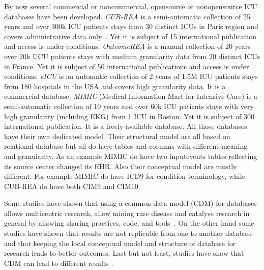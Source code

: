 \documentclass{aes2e}
\begin{document}
By now several commercial or noncommercial, opensource or nonopensource ICU
databases have been developed.
\emph{CUB-REA} is a semi-automatic collection of 25 years and over 300k ICU
patients stays from 30 distinct ICUs in Paris region and covers administrative
data only \cite{cubrea-descr,cubrea-website}. Yet it is subject of 15
international publication and access is under conditions.
\emph{OutcomeREA} is a manual collection of 20 years over 20k UCU patients
stays with medium granularity data from 20 distinct ICUs in France. Yet it is
subject of 50 international publications and access is under conditions.
\emph{eICU} \cite{eicu-website} is an automatic collection of 2 years of 1.5M
ICU patients stays from 180 hospitals in the USA and covers high granularity
data. It is a commercial database.
\emph{MIMIC} (Medical Information Mart for Intensive Care) is a
semi-automatic collection of 10 years and over 60k ICU patients stays with very
high granularity (including EKG) from 1 ICU in Boston. Yet it is subject of 300
international publication. It is a freely-available database.
All those databases have their own dedicated model. Their structural model
are all based on relational database but all do have tables and columns with
different meaning and granularity. As an example MIMIC do have two inputevents
tables reflecting its source center changed its EHR. Also their conceptual
model are mostly different. For example MIMIC do have ICD9 for condition
terminology, while CUB-REA do have both CIM9 and CIM10. 

Some studies have shown that using a common data model (CDM) for databases
allows multicentric research, allow mining rare disease  and
catalyse research in general by allowing sharing practices, code, and
tools \cite{cdm-review}. On the other hand some studies have shown that results are
not replicable from one to another database \cite{omop-replicability} and that
keeping the local conceptual model \cite{fhir-deep} and structure
\cite{imi-protect} of database for research leads to better outcomes. Last but
not least, studies have show that CDM can lead to different results
\cite{cdm-comparison}.
\end{document}
